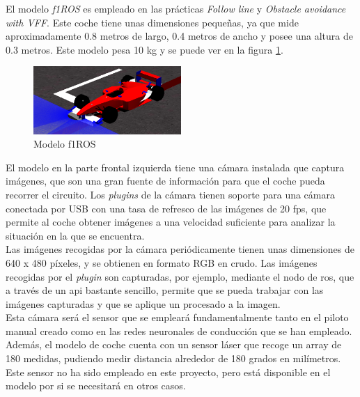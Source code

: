 El modelo \textit{f1ROS} es empleado en las prácticas \textit{Follow line} y \textit{Obstacle avoidance with VFF}. Este coche tiene unas dimensiones pequeñas, ya que mide aproximadamente 0.8 metros de largo, 0.4 metros de ancho y posee una altura de 0.3 metros. Este modelo pesa 10 kg y se puede ver en la figura \ref{fig.f1}.\\

\begin{figure}
  \begin{center}
    \includegraphics[width=0.5\textwidth]{figures/Infraestructura/f1.png}
		\caption{Modelo f1ROS}
		\label{fig.f1}
		\end{center}
\end{figure}

El modelo en la parte frontal izquierda tiene una cámara instalada que captura imágenes, que son una gran fuente de información para que el coche pueda recorrer el circuito. Los \textit{plugins} de la cámara tienen soporte para una cámara conectada por USB con una tasa de refresco de las imágenes de 20 fps, que permite al coche obtener imágenes a una velocidad suficiente para analizar la situación en la que se encuentra.\\

Las imágenes recogidas por la cámara periódicamente tienen unas dimensiones de 640 x 480 píxeles, y se obtienen en formato RGB en crudo. Las imágenes recogidas por el \textit{plugin} son capturadas, por ejemplo, mediante el nodo de \acrshort{ros}, que a través de un \acrshort{api} bastante sencillo, permite que se pueda trabajar con las imágenes capturadas y que se aplique un procesado a la imagen.\\

Esta cámara será el sensor que se empleará fundamentalmente tanto en el piloto manual creado como en las redes neuronales de conducción que se han empleado. Además, el modelo de coche cuenta con un sensor láser que recoge un array de 180 medidas, pudiendo medir distancia alrededor de 180 grados en milímetros. Este sensor no ha sido empleado en este proyecto, pero está disponible en el modelo por si se necesitará en otros casos. \\

